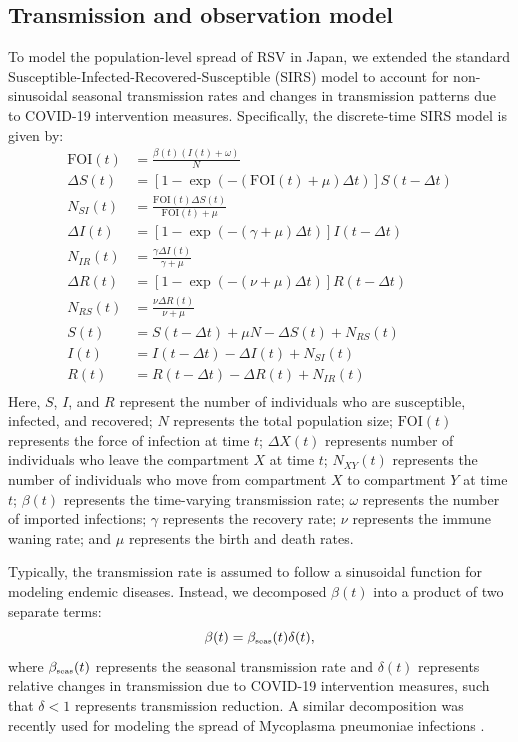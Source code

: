 \documentclass[12pt]{article}
\newcommand{\tsub}[2]{#1_{{\textrm{\tiny #2}}}}
\begin{document}
\subsection*{Transmission and observation model}

To model the population-level spread of RSV in Japan, we extended the standard Susceptible-Infected-Recovered-Susceptible (SIRS) model to account for non-sinusoidal seasonal transmission rates and changes in transmission patterns due to COVID-19 intervention measures.
Specifically, the discrete-time SIRS model is given by:
\begin{align}
\mathrm{FOI}(t) &= \frac{\beta(t) (I(t) + \omega)}{N}\\
\Delta S(t) &= \left[1- \exp(-(\mathrm{FOI}(t) + \mu) \Delta t )\right] S(t-\Delta t)\\
N_{SI}(t) &= \frac{\mathrm{FOI}(t)\Delta S(t)}{\mathrm{FOI}(t) + \mu} \\
\Delta I(t) &= \left[1- \exp(-(\gamma + \mu) \Delta t )\right] I(t-\Delta t)\\
N_{IR}(t) &= \frac{\gamma \Delta I(t)}{\gamma + \mu} \\
\Delta R(t) &= \left[1- \exp(-(\nu + \mu) \Delta t )\right] R(t-\Delta t)\\
N_{RS}(t) &= \frac{\nu \Delta R(t)}{\nu + \mu} \\
S(t) &= S(t-\Delta t) + \mu N - \Delta S(t) + N_{RS}(t)  \\
I(t) &= I(t-\Delta t) - \Delta I(t) + N_{SI}(t)  \\
R(t) &= R(t-\Delta t) - \Delta R(t) + N_{IR}(t)  \\
\end{align}
Here, $S$, $I$, and $R$ represent the number of individuals who are susceptible, infected, and recovered;
$N$ represents the total population size;
$\mathrm{FOI}(t)$ represents the force of infection at time $t$;
$\Delta X(t)$ represents number of individuals who leave the compartment $X$ at time $t$;
$N_{XY}(t)$ represents the number of individuals who move from compartment $X$ to compartment $Y$ at time $t$;
$\beta(t)$ represents the time-varying transmission rate;
$\omega$ represents the number of imported infections;
$\gamma$ represents the recovery rate;
$\nu$ represents the immune waning rate;
and $\mu$ represents the birth and death rates.

Typically, the transmission rate is assumed to follow a sinusoidal function for modeling endemic diseases.
Instead, we decomposed $\beta(t)$ into a product of two separate terms:
\begin{equation}
\beta(t) = \tsub{\beta}{seas}(t) \delta(t),
\end{equation}
where $\tsub{\beta}{seas}(t)$ represents the seasonal transmission rate and $\delta(t)$ represents relative changes in transmission due to COVID-19 intervention measures, such that $\delta < 1$ represents transmission reduction.
A similar decomposition was recently used for modeling the spread of Mycoplasma pneumoniae infections \citep{park2024myco}.
\end{document}
